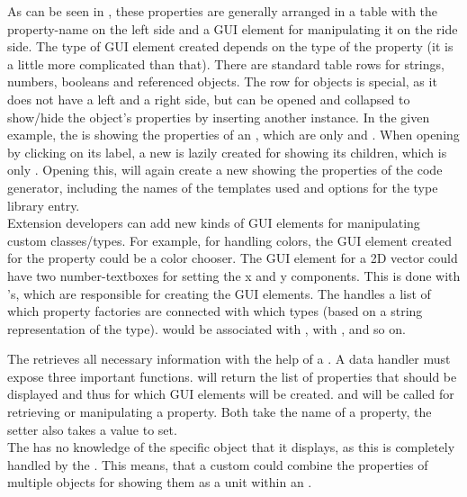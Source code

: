 As can be seen in , these properties are generally arranged in a table with the property-name on the left side and a GUI element for manipulating it on the ride side. The type of GUI element created depends on the type of the property (it is a little more complicated than that). There are standard table rows for strings, numbers, booleans and referenced objects. The row for objects is special, as it does not have a left and a right side, but can be opened and collapsed to show/hide the object's properties by inserting another  instance. In the given example, the  is showing the properties of an , which are only  and . When opening  by clicking on its label, a new  is lazily created for showing its children, which is only . Opening this, will again create a new  showing the properties of the code generator, including the names of the templates used and options for the type library entry.\\
Extension developers can add new kinds of GUI elements for manipulating custom classes/types. For example, for handling colors, the GUI element created for the property could be a color chooser. The GUI element for a 2D vector could have two number-textboxes for setting the x and y components. This is done with 's, which are responsible for creating the GUI elements. The  handles a list of which property factories are connected with which types (based on a string representation of the type).  would be associated with ,  with , and so on. 

The  retrieves all necessary information with the help of a . A data handler must expose three important functions.  will return the list of properties that should be displayed and thus for which GUI elements will be created.  and  will be called for retrieving or manipulating a property. Both take the name of a property, the setter also takes a value to set.\\
The  has no knowledge of the specific  object that it displays, as this is completely handled by the . This means, that a custom  could combine the properties of multiple objects for showing them as a unit within an .

